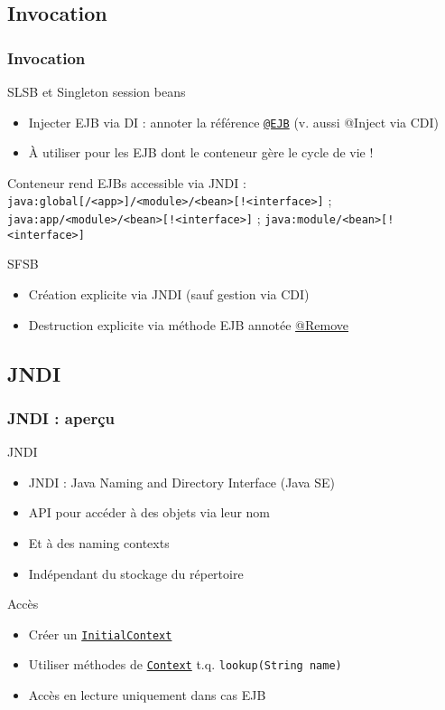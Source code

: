 \documentclass[english, french]{beamer}
\begin{document}
\subsection{Invocation}
\begin{frame}
	\frametitle{Invocation}
	\begin{block}{SLSB et Singleton session beans}
		\begin{itemize}
			\item Injecter EJB via DI : annoter la référence \href{https://docs.oracle.com/javaee/7/api/javax/ejb/EJB.html}{\texttt{@EJB}} {\tiny (v. aussi @Inject via CDI)}
			\item À utiliser pour les EJB dont le conteneur gère le cycle de vie !
		\end{itemize}
	\end{block}
	Conteneur rend EJBs accessible via JNDI : \texttt{java:global[/<app>]/<module>/<bean>[!<interface>]} ; \texttt{java:app/<module>/<bean>[!<interface>]} ; \texttt{java:module/<bean>[!<interface>]}
	\begin{block}{SFSB}
		\begin{itemize}
			\item Création explicite via JNDI {\tiny (sauf gestion via CDI)}
			\item Destruction explicite via méthode EJB annotée \href{https://docs.oracle.com/javaee/7/api/javax/ejb/Remove.html}{@Remove}
		\end{itemize}
	\end{block}
\end{frame}

\subsection{JNDI}
\begin{frame}
	\frametitle{JNDI : aperçu}
	\begin{block}{JNDI}
		\begin{itemize}
			\item JNDI : Java Naming and Directory Interface (Java SE)
			\item API pour accéder à des objets via leur nom
			\item Et à des \og{}naming contexts\fg{}
			\item Indépendant du stockage du répertoire
		\end{itemize}
	\end{block}
	\begin{block}{Accès}
		\begin{itemize}
			\item Créer un \href{https://docs.oracle.com/javase/8/docs/api/javax/naming/InitialContext.html}{\texttt{InitialContext}}
			\item Utiliser méthodes de \href{https://docs.oracle.com/javase/8/docs/api/javax/naming/Context.html}{\texttt{Context}} t.q. \texttt{lookup(String name)}
			\item Accès en lecture uniquement dans cas EJB
		\end{itemize}
	\end{block}
\end{frame}
\end{document}
